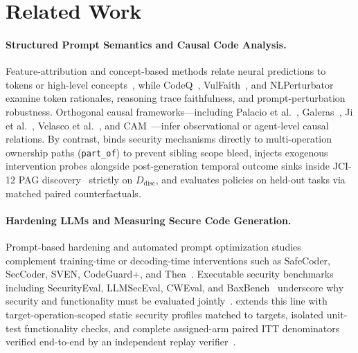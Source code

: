 \section{Related Work}

\paragraph{Structured Prompt Semantics and Causal Code Analysis.}
Feature-attribution and concept-based methods relate neural predictions to
tokens or high-level concepts~\cite{sundararajan2017integrated,kim2018tcav,lundberg2017shap,deyoung2020eraser},
while CodeQ~\cite{khati2026codeq}, VulFaith~\cite{wang2026vulfaith}, and
NLPerturbator~\cite{chen2026nlperturbator} examine token rationales, reasoning
trace faithfulness, and prompt-perturbation robustness. Orthogonal causal
frameworks---including Palacio et al.~\cite{palacio2024causation},
Galeras~\cite{rodriguezcardenas2023benchmarking}, Ji et
al.~\cite{ji2025causality}, Velasco et al.~\cite{velasco2026smells}, and
CAM~\cite{lyu2026cam}---infer observational or agent-level causal relations.
By contrast, \model binds security mechanisms directly to multi-operation
\prompttsg ownership paths (\texttt{part\_of}) to prevent sibling scope bleed, injects
exogenous intervention probes alongside post-generation temporal outcome sinks
inside JCI-12 PAG discovery~\cite{mooij2020jci,zhang2008ancestral} strictly on
$D_{\mathrm{disc}}$, and evaluates policies on held-out tasks via matched
paired counterfactuals.

\paragraph{Hardening LLMs and Measuring Secure Code Generation.}
Prompt-based hardening and automated prompt optimization
studies~\cite{tony2025prompting,cicalese2026language,bruni2025promptbenchmark,nazzal2024promsec}
complement training-time or decoding-time interventions such as SafeCoder,
SecCoder, SVEN, CodeGuard+, and
Thea~\cite{he2024safecoder,zhang2024seccoder,he2023sven,fu2024codeguard,elhusseini2026thea}.
Executable security benchmarks including SecurityEval, LLMSecEval, CWEval,
and BaxBench~\cite{siddiq2022securityeval,tony2023llmseceval,peng2025cweval,vero2025baxbench}
underscore why security and functionality must be evaluated jointly~\cite{dai2026rethinking}.
\model extends this line with target-operation-scoped static security
profiles matched to \prompttsg targets, isolated unit-test functionality checks,
and complete assigned-arm paired ITT denominators verified end-to-end by an
independent replay verifier~\cite{miller2019explanation}.
